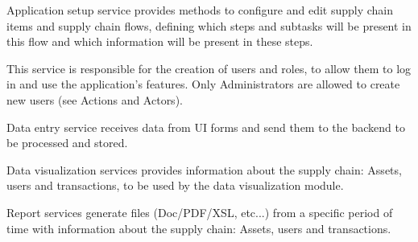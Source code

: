 Application setup service provides methods to configure and edit  supply chain items and supply chain flows, defining which steps and subtasks will be present in this flow and which information will be present in these steps.

This service is responsible for the creation of users and roles, to allow them to log in and use the application’s features. Only Administrators are allowed to create new users (see Actions and Actors).

Data entry service receives data from UI forms and send them to the backend to be processed and stored.

Data visualization services provides information about the supply chain: Assets, users and transactions, to be used by the data visualization module.

Report services generate files (Doc/PDF/XSL, etc...) from a specific period of time with information about the supply chain: Assets, users and transactions.